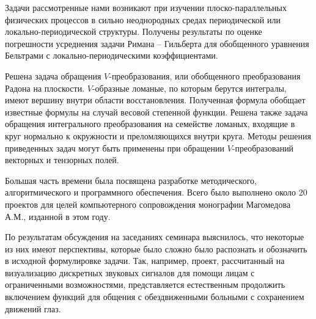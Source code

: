 Задачи рассмотренные нами возникают при изучении плоско-парал\-лельных физических процессов в сильно неоднородных
 средах периодической или локально-периодической структуры.
Получены результаты по оценке погрешности усреднения задачи Римана -- Гильберта для обобщенного уравнения Бельтрами
 с локально-периодическими коэффициентами.



Решена задача обращения $V$-преобразования, или обобщенного преобразования Радона на плоскости. $V$-образные ломаные, по которым берутся интегралы, имеют вершину внутри области восстановления. Полученная формула обобщает известные формулы на случай весовой степенной функции.  Решена также задача обращения интегрального преобразования на семействе ломаных, входящие в круг нормально к окружности и преломляющихся внутри круга.
Методы решения приведенных задач могут быть применены при обращении $V$-преобразований векторных и тензорных полей.



Большая часть времени была посвящена разработке методического, алгоритмического и программного обеспечения. Всего было выполнено около 20 проектов для целей компьютерного сопровождения монографии Магомедова А.М., изданной в этом году.

По результатам обсуждения на заседаниях семинара выяснилось, что некоторые из них имеют перспективы, которые было сложно было распознать и обозначить в исходной формулировке задачи. Так, например, проект, рассчитанный на визуализацию дискретных звуковых сигналов для помощи лицам с ограниченными возможностями, представляется естественным продолжить включением функций для общения с обездвиженными больными с сохранением движений глаз.


